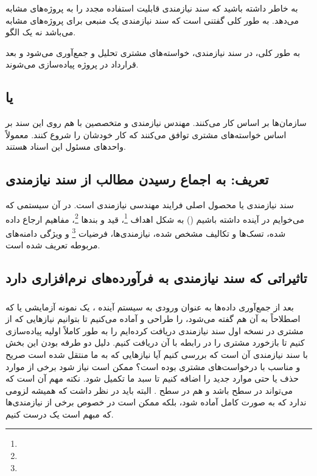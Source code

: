 به خاطر داشته باشید که سند نیازمندی قابلیت استفاده مجدد را به پروژه‌های مشابه
می‌دهد. به طور کلی گفتنی است که سند نیازمندی یک منبعی برای پروژه‌های مشابه
می‌باشد نه یک الگو.

به طور کلی، در سند نیازمندی، خواسته‌های مشتری تحلیل و جمع‌آوری می‌شود و بعد
قرارداد در پروژه پیاده‌سازی می‌شوند.

\subsection{ یا }

سازمان‌ها بر اساس  کار می‌کنند. مهندس نیازمندی و متخصصین با هم روی این
سند بر اساس خواسته‌های مشتری توافق می‌کنند که کار خودشان را شروع کنند. معمولاً
واحد‌های  مسئول این اسناد هستند.

\subsection{تعریف: به اجماع رسیدن مطالب از سند نیازمندی}

سند نیازمندی یا  محصول اصلی فرایند مهندسی نیازمندی است.
در آن سیستمی که می‌خوایم در آینده داشته باشیم () به شکل اهداف
\footnote{}، قید و بند‌ها \footnote{}، مفاهیم
ارجاع داده شده، تسک‌ها و تکالیف مشخص شده، نیازمندی‌ها، فرضیات
\footnote{} و ویژگی دامنه‌های مربوطه تعریف شده است.

\subsection{تاثیراتی که سند نیازمندی به فرآورده‌های نرم‌افزاری دارد}

\subsubsection{}

بعد از جمع‌آوری داده‌ها به عنوان ورودی به سیستم آینده ، یک
نمونه آزمایشی یا  که اصطلاحاً به آن  هم گفته می‌شود،
را طراحی و آماده می‌کنیم تا بتوانیم نیاز‌هایی که از مشتری در نسخه اول سند
نیازمندی دریافت کرده‌ایم را به طور کاملاً اولیه پیاده‌سازی کنیم تا بازخورد مشتری
را در رابطه با آن دریافت کنیم. دلیل دو طرفه بودن این بخش با سند نیازمندی آن است
که بررسی کنیم آیا نیاز‌هایی که به ما منتقل شده است صریح و مناسب با درخواست‌های
مشتری بوده است؟ ممکن است نیاز شود برخی از موارد حذف یا حتی موارد جدید را اضافه
کنیم تا سبد  ما تکمیل شود. نکته مهم آن است که  می‌تواند
در سطح  باشد و هم در سطح . البته باید در نظر
داشت که همیشه  لزومی ندارد که به صورت کامل آماده شود، بلکه ممکن
است در خصوص برخی از نیازمندی‌ها که مبهم است یک  درست کنیم.

